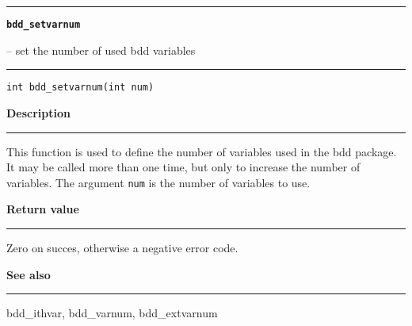 \begin{minipage}{\textwidth}

\noindent\begin{minipage}{\textwidth}
\rule{\textwidth}{0.5mm}
{\tt\bf bdd\_setvarnum }
\--- set the number of used bdd variables  \hspace{\fill}
\\\rule[1.5ex]{\textwidth}{0.5mm}
\end{minipage}

\noindent\begin{verbatim}
int bdd_setvarnum(int num) 
\end{verbatim}

\vspace{\parsep}\noindent
{\bf Description}\\\rule[1.5ex]{\textwidth}{0.2mm}\vspace{-1.5ex}\setlength{\parindent}{1em}
This function is used to define the number of variables used in
           the bdd package. It may be called more than one time, but only
	   to increase the number of variables. The argument
	   {\tt num} is the number of variables to use. 

\setlength{\parindent}{0em}\vspace{\parsep}\vspace{\baselineskip}\noindent
{\bf Return value}\\\rule[1.5ex]{\textwidth}{0.2mm}\vspace{-1.5ex}
Zero on succes, otherwise a negative error code. 

\vspace{\parsep}\vspace{\baselineskip}\noindent
{\bf See also}\\\rule[1.5ex]{\textwidth}{0.2mm}\vspace{-1.5ex}
bdd\_ithvar, bdd\_varnum, bdd\_extvarnum 
\end{minipage}
\vspace{8ex}
